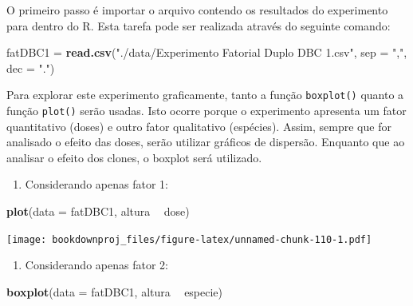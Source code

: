 \documentclass[
]{article}
\newenvironment{Shaded}{\begin{snugshade}}{\end{snugshade}}
\newcommand{\DataTypeTok}[1]{\textcolor[rgb]{0.13,0.29,0.53}{#1}}
\newcommand{\KeywordTok}[1]{\textcolor[rgb]{0.13,0.29,0.53}{\textbf{#1}}}
\newcommand{\NormalTok}[1]{#1}
\newcommand{\OperatorTok}[1]{\textcolor[rgb]{0.81,0.36,0.00}{\textbf{#1}}}
\newcommand{\StringTok}[1]{\textcolor[rgb]{0.31,0.60,0.02}{#1}}
\providecommand{\tightlist}{%
  \setlength{\itemsep}{0pt}\setlength{\parskip}{0pt}}
\begin{document}
O primeiro passo é importar o arquivo contendo os resultados do experimento para dentro do R. Esta tarefa pode ser realizada através do seguinte comando:

\begin{Shaded}
\begin{Highlighting}[]
\NormalTok{fatDBC1 =}\StringTok{ }\KeywordTok{read.csv}\NormalTok{(}\StringTok{"./data/Experimento Fatorial Duplo DBC 1.csv"}\NormalTok{, }
                   \DataTypeTok{sep =} \StringTok{","}\NormalTok{, }\DataTypeTok{dec =} \StringTok{"."}\NormalTok{)}
\end{Highlighting}
\end{Shaded}

Para explorar este experimento graficamente, tanto a função \texttt{boxplot()} quanto a função \texttt{plot()} serão usadas. Isto ocorre porque o experimento apresenta um fator quantitativo (doses) e outro fator qualitativo (espécies). Assim, sempre que for analisado o efeito das doses, serão utilizar gráficos de dispersão. Enquanto que ao analisar o efeito dos clones, o boxplot será utilizado.

\begin{enumerate}
\def\labelenumi{\arabic{enumi}.}
\tightlist
\item
  Considerando apenas fator 1:
\end{enumerate}

\begin{Shaded}
\begin{Highlighting}[]
\KeywordTok{plot}\NormalTok{(}\DataTypeTok{data =}\NormalTok{ fatDBC1, altura }\OperatorTok{~}\StringTok{ }\NormalTok{dose)}
\end{Highlighting}
\end{Shaded}

\texttt{[image: bookdownproj\_files/figure-latex/unnamed-chunk-110-1.pdf]}

\begin{enumerate}
\def\labelenumi{\arabic{enumi}.}
\setcounter{enumi}{1}
\tightlist
\item
  Considerando apenas fator 2:
\end{enumerate}

\begin{Shaded}
\begin{Highlighting}[]
\KeywordTok{boxplot}\NormalTok{(}\DataTypeTok{data =}\NormalTok{ fatDBC1, altura }\OperatorTok{~}\StringTok{ }\NormalTok{especie)}
\end{Highlighting}
\end{Shaded}
\end{document}
